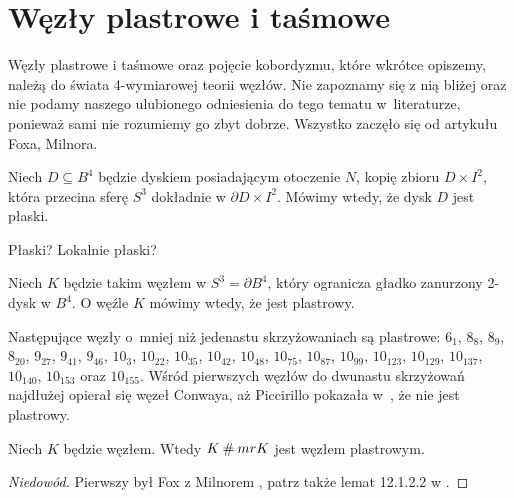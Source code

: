 \section{Węzły plastrowe i taśmowe}
\label{sec:slice}
Węzły plastrowe i taśmowe oraz pojęcie kobordyzmu, które wkrótce opiszemy, należą do świata 4-wymiarowej teorii węzłów.
Nie zapoznamy się z nią bliżej oraz nie podamy naszego ulubionego odniesienia do tego tematu w~literaturze, ponieważ sami nie rozumiemy go zbyt dobrze.
Wszystko zaczęło się od artykułu \cite{fox66} Foxa, Milnora.


\begin{definition}
    Niech $D \subseteq B^4$ będzie dyskiem posiadającym otoczenie $N$, kopię zbioru $D \times I^2$, która przecina sferę $S^3$ dokładnie w $\partial D \times I^2$.
    Mówimy wtedy, że dysk $D$ jest płaski.
\end{definition}

\begin{tobedone}
    Płaski? Lokalnie płaski?
    \cite[s. 155]{kawauchi96}
\end{tobedone}

\begin{definition}
    Niech $K$ będzie takim węzłem w $S^3 = \partial B^4$, który ogranicza gładko zanurzony 2-dysk w $B^4$.
    O węźle $K$ mówimy wtedy, że jest plastrowy.
\end{definition}

Następujące węzły o~mniej niż jedenastu skrzyżowaniach są plastrowe: $6_1$, $8_{8}$, $8_{9}$, $8_{20}$, $9_{27}$, $9_{41}$, $9_{46}$, $10_{3}$, $10_{22}$, $10_{35}$, $10_{42}$, $10_{48}$, $10_{75}$, $10_{87}$, $10_{99}$, $10_{123}$, $10_{129}$, $10_{137}$, $10_{140}$, $10_{153}$ oraz $10_{155}$.
Wśród pierwszych węzłów do dwunastu skrzyżowań najdłużej opierał się węzeł Conwaya, aż Piccirillo pokazała w~\cite{piccirillo20}, że nie jest plastrowy.

\begin{proposition}
    Niech $K$ będzie węzłem.
    Wtedy $K \mathbin{\#} mr K$ jest węzłem plastrowym.
\end{proposition}

\begin{proof}[Niedowód]
    Pierwszy był Fox z Milnorem \cite{fox66}, patrz także lemat 12.1.2.2 w \cite{kawauchi96}.
\end{proof}

